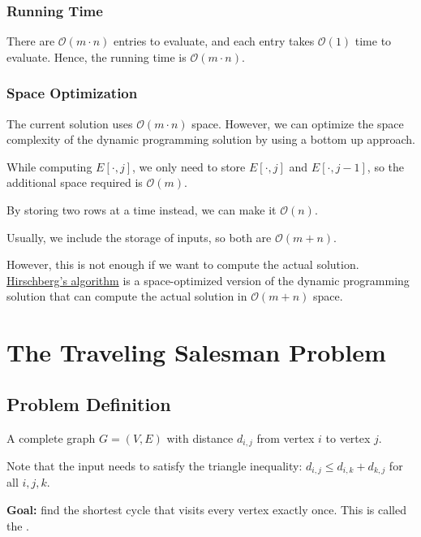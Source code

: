 \subsubsection{Running Time}

There are $\mathcal{O}(m \cdot n)$ entries to evaluate, and each entry takes $\mathcal{O}(1)$ time to evaluate. Hence, the running time is $\mathcal{O}(m \cdot n)$.

\subsubsection{Space Optimization}

The current solution uses $\mathcal{O}(m \cdot n)$ space. However, we can optimize the space complexity of the dynamic programming solution by using a bottom up approach. 

\begin{listu}
    \item While computing $E[\cdot,j]$, we only need to store $E[\cdot,j]$ and $E[\cdot,j-1]$, so the additional space required is $\mathcal{O}(m)$.
    \item By storing two rows at a time instead, we can make it $\mathcal{O}(n)$.
    \item Usually, we include the storage of inputs, so both are $\mathcal{O}(m + n)$.
\end{listu}

However, this is not enough if we want to compute the actual solution. \href{https://en.wikipedia.org/wiki/Hirschberg%27s_algorithm}{Hirschberg's algorithm} is a space-optimized version of the dynamic programming solution that can compute the actual solution in $\mathcal{O}(m + n)$ space.


\section{The Traveling Salesman Problem}

\subsection{Problem Definition}

\begin{listu}
    \item A complete graph $G = (V, E)$ with distance $d_{i, j}$ from vertex $i$ to vertex $j$.
    
    Note that the input needs to satisfy the triangle inequality: $d_{i, j} \le d_{i, k} + d_{k, j}$ for all $i, j, k$.

    \item \textbf{Goal:} find the shortest cycle that visits every vertex exactly once. This is called the .
\end{listu}

